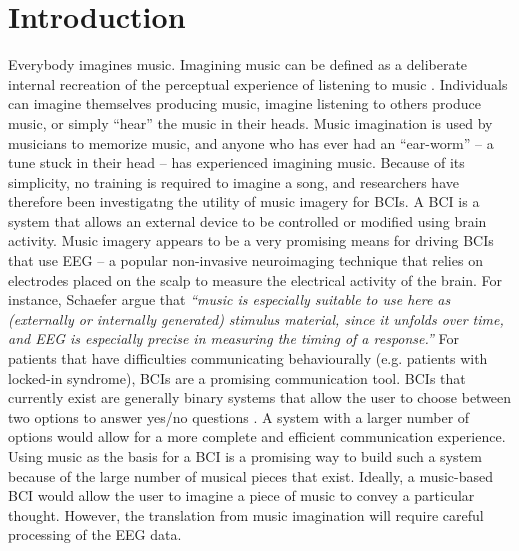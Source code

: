 \chapter{Introduction}

Everybody imagines music. Imagining music can be defined as a deliberate internal recreation of the perceptual experience of listening to music \cite{schaefer_name_2011}.
Individuals can imagine themselves producing music, imagine listening to others produce music, or simply ``hear'' the music in their heads. 
Music imagination is used by musicians to memorize music, and anyone who has ever had an ``ear-worm'' -- a tune stuck in their head -- has experienced imagining music. 
Because of its simplicity, no training is required to imagine a song, and researchers have therefore been investigatng the utility of music imagery for \acp{BCI}.
A \ac{BCI} is a system that allows an external device to be controlled or modified using brain activity. 
Music imagery appears to be a very promising means for driving \acp{BCI} that use \ac{EEG} -- a popular non-invasive neuroimaging technique that relies on electrodes placed on the scalp to measure the electrical activity of the brain.
For instance, Schaefer \etal\citeyear{schaefer_measuring_2011} argue that
\emph{``music is especially suitable to use here as (externally or internally generated) stimulus material, since it unfolds over time, and \ac{EEG} is especially precise in measuring the timing of a response.''}
For patients that have difficulties communicating behaviourally (e.g. patients with locked-in syndrome), \ac{BCI}s are a promising communication tool. 
{BCI}s that currently exist are generally binary systems that allow the user to choose between two options to answer yes/no questions \cite{Monti2010}.
A system with a larger number of options would allow for a more complete and efficient communication experience. 
Using music as the basis for a \ac{BCI} is a promising way to build such a system because of the large number of musical pieces that exist. 
Ideally, a music-based \ac{BCI} would allow the user to imagine a piece of music to convey a particular thought. 
However, the translation from music imagination will require careful processing of the EEG data. 

